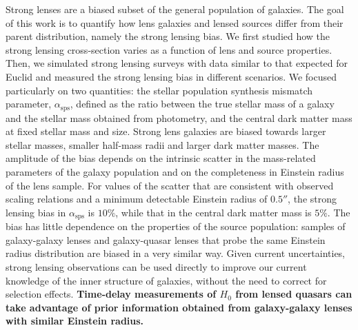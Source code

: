 \documentclass{aa}
\def\asps{\alpha_{\mathrm{sps}}}
\begin{document}
  \abstract
    {
Strong lenses are a biased subset of the general population of galaxies.
}
   {
The goal of this work is to quantify how lens galaxies and lensed sources differ from their parent distribution, namely the strong lensing bias.
} 
   {
We first studied how the strong lensing cross-section varies as a function of lens and source properties. 
Then, we simulated strong lensing surveys with data similar to that expected for Euclid and measured the strong lensing bias in different scenarios.
We focused particularly on two quantities: the stellar population synthesis mismatch parameter, $\asps$, defined as the ratio between the true stellar mass of a galaxy and the stellar mass obtained from photometry, and the central dark matter mass at fixed stellar mass and size.
}
   {
Strong lens galaxies are biased towards larger stellar masses, smaller half-mass radii and larger dark matter masses.
The amplitude of the bias depends on the intrinsic scatter in the mass-related parameters of the galaxy population and on the completeness in Einstein radius of the lens sample.
For values of the scatter that are consistent with observed scaling relations and a minimum detectable Einstein radius of $0.5''$, the strong lensing bias in $\asps$ is $10\%$, while that in the central dark matter mass is $5\%$.
The bias has little dependence on the properties of the source population: samples of galaxy-galaxy lenses and galaxy-quasar lenses that probe the same Einstein radius distribution are biased in a very similar way.
}
   {
Given current uncertainties, strong lensing observations can be used directly to improve our current knowledge of the inner structure of galaxies, without the need to correct for selection effects.
{\bf Time-delay measurements of $H_0$ from lensed quasars can take advantage of prior information obtained from galaxy-galaxy lenses with similar Einstein radius.}
}
\end{document}
